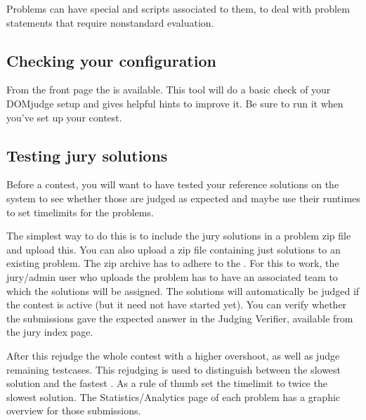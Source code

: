 \documentclass[a4paper,10pt,english,openany]{sphinxmanual}
\begin{document}
\sphinxAtStartPar
Problems can have special  and
 scripts associated to them, to deal with problem
statements that require non\sphinxhyphen{}standard evaluation.


\subsection{Checking your configuration}
\label{\detokenize{config-basic:checking-your-configuration}}
\sphinxAtStartPar
From the front page the  is available. This tool will
do a basic check of your DOMjudge setup and gives helpful hints to
improve it. Be sure to run it when you’ve set up your contest.


\subsection{Testing jury solutions}
\label{\detokenize{config-basic:testing-jury-solutions}}
\sphinxAtStartPar
Before a contest, you will want to have tested your reference
solutions on the system to see whether those are judged as expected
and maybe use their runtimes to set timelimits for the problems.

\sphinxAtStartPar
The simplest way to do this is to include the jury solutions in a
problem zip file and upload this. You can also upload a zip file
containing just solutions to an existing problem. The zip
archive has to adhere to the {\hyperref[\detokenize{problem-format::doc}]{}}.
For this to work, the jury/admin user who uploads the problem has to
have an associated team to which the solutions will be assigned. The
solutions will automatically be judged if the contest is active (but
it need not have started yet). You can verify whether the submissions
gave the expected answer in the Judging Verifier, available from
the jury index page.

\sphinxAtStartPar
After this rejudge the whole contest with a higher overshoot, as well as
judge remaining testcases. This rejudging is used to distinguish between the
slowest  solution and the fastest .
As a rule of thumb set the timelimit to twice the slowest 
solution. The Statistics/Analytics page of each problem has a graphic
overview for those submissions.

\sphinxstepscope
\end{document}
